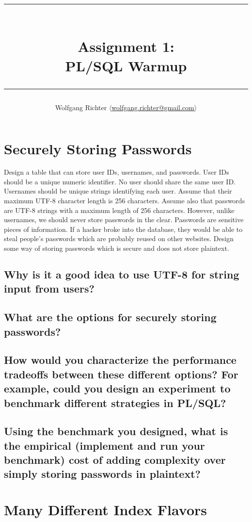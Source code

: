\documentclass[12pt]{article}
\title{\rule{\linewidth}{0.5mm}\\
\textbf{Assignment 1:}\\
PL/SQL Warmup\\
\rule{\linewidth}{1.0mm}}
\author{Wolfgang Richter \textnormal{$\langle$}\href{mailto:wolfgang.richter@gmail.com}{wolfgang.richter@gmail.com}\textnormal{$\rangle$}}
\begin{document}
\maketitle

\section{Securely Storing Passwords}

Design a table that can store user IDs, usernames, and passwords.  User IDs
should be a unique numeric identifier.  No user should share the same user ID.
Usernames should be unique strings identifying each user.  Assume that their
maximum UTF-8 character length is 256 characters.  Assume also that passwords
are UTF-8 strings with a maximum length of 256 characters.  However, unlike
usernames, we should never store passwords in the clear.  Passwords are
sensitive pieces of information.  If a hacker broke into the database, they
would be able to steal people's passwords which are probably reused on other
websites.  Design some way of storing passwords which is secure and does not
store plaintext.

\subsection{Why is it a good idea to use UTF-8 for string input from users?}

\subsection{What are the options for securely storing passwords?}

\subsection{How would you characterize the performance tradeoffs between these
different options?  For example, could you design an experiment to benchmark
different strategies in PL/SQL?}

\subsection{Using the benchmark you designed, what is the empirical (implement
and run your benchmark) cost of adding complexity over simply storing passwords
in plaintext?}

\newpage\section{Many Different Index Flavors}
\end{document}
